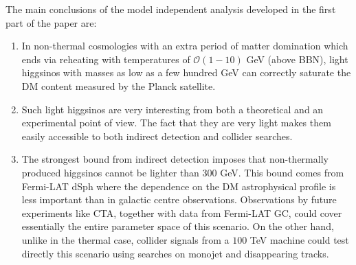 \documentclass[11pt,a4paper]{article}
\newcommand{\mc}{\mathcal}
\begin{document}
The main conclusions of the model independent analysis developed in the first part of the paper are:
\begin{enumerate}
\item In non-thermal cosmologies with an extra period of matter domination which ends via reheating with temperatures of $\mc{O}(1 - 10)$ GeV (above BBN), light higgsinos with masses as low as a few hundred GeV can correctly saturate the DM content measured by the Planck satellite. 

\item Such light higgsinos are very interesting from both a theoretical and an experimental point of view. The fact that they are very light makes them easily accessible to both indirect detection and collider searches.

\item The strongest bound from indirect detection imposes that non-thermally produced higgsinos cannot be lighter than $300$ GeV. This bound comes from Fermi-LAT dSph where the dependence on the DM astrophysical profile is less important than in galactic centre observations. Observations by future experiments like CTA, together with data from Fermi-LAT GC, could cover essentially the entire parameter space of this scenario. On the other hand, unlike in the thermal case, collider signals from a $100$ TeV machine could test directly this scenario using searches on monojet and disappearing tracks.
\end{enumerate}
\end{document}
